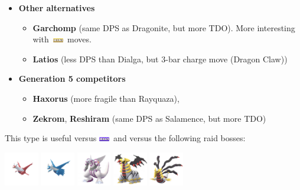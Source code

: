 \documentclass[12pt]{beamer}
\newcommand{\dragonfull}{\includegraphics[height=0.2cm]{../../images/type/full/Dragon.png}}
\newcommand{\groundfull}{\includegraphics[height=0.2cm]{../../images/type/full/Ground.png}}
\begin{document}
\begin{frame}[label=Dragon]
\begin{footnotesize}
\begin{block}{}
\begin{center}
\begin{itemize}
\item \textbf{Other alternatives}
\begin{itemize}
  \item \footnotesize \textbf{Garchomp} (same DPS as Dragonite, but more TDO). More interesting with~\groundfull~moves.
  \item \footnotesize \textbf{Latios} (less DPS than Dialga, but 3-bar charge move (Dragon Claw))
\end{itemize}
\item \textbf{Generation 5 competitors}
\begin{itemize}
  \item \footnotesize  \textbf{Haxorus} (more fragile than Rayquaza),
  \item \footnotesize \textbf{Zekrom}, \textbf{Reshiram} (same DPS as Salamence, but more TDO)
\end{itemize}
\end{itemize}
\end{center}
\end{block}

\begin{block}{}\begin{center}
This type is useful versus \dragonfull~and versus the following raid bosses:

    \includegraphics[width=1.5cm]{../../images/pokemon/latias.png}
    \includegraphics[width=1.5cm]{../../images/pokemon/latios.png}
    \includegraphics[width=1.5cm]{../../images/pokemon/palkia.png}\quad
    \includegraphics[width=1.5cm]{../../images/pokemon/giratina_a.png}\quad
    \includegraphics[width=1.5cm]{../../images/pokemon/giratina_o.png}
\end{center}
\end{block}

\end{footnotesize}
\end{frame}
\end{document}
